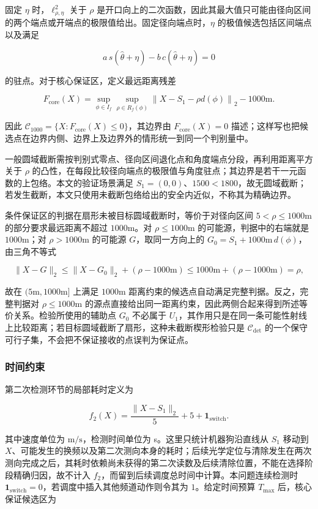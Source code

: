 固定 $\eta$ 时，$\ell_{\rho,\eta}^2$ 关于 $\rho$ 是开口向上的二次函数，因此其最大值只可能由径向区间的两个端点或开端点的极限值给出。固定径向端点时，$\eta$ 的极值候选包括区间端点以及满足

\[
a\,s(\hat\theta+\eta)-b\,c(\hat\theta+\eta)=0
\]

的驻点。对于核心保证区，定义最远距离残差

\[
F_{\mathrm{core}}(X)=
\sup_{\phi\in I_f}\sup_{\rho\in R_f(\phi)}
\left\lVert
X-S_1-\rho d(\phi)
\right\rVert_2-1000\mathrm{m}.
\]

因此 $\mathcal C_{1000}=\{X:F_{\mathrm{core}}(X)\le0\}$，其边界由 $F_{\mathrm{core}}(X)=0$ 描述；这样写也把候选点在边界内侧、边界上及边界外的情形统一到同一个判别量中。

一般圆域截断需按判别式零点、径向区间退化点和角度端点分段，再利用距离平方关于 $\rho$ 的凸性，在每段比较径向端点的极限值与角度驻点；其边界是若干一元函数的上包络。本文的验证场景满足 $S_1=(0,0)$、$1500<1800$，故无圆域截断；若发生截断，本文只使用未截断包络给出的安全内近似，不称其为精确边界。

条件保证区的判据在扇形未被目标圆域截断时，等价于对径向区间 $5<\rho\le1000\mathrm{m}$ 的部分要求最远距离不超过 $1000\mathrm{m}$。对 $\rho\le1000\mathrm{m}$ 的可能源，判据中的右端就是 $1000\mathrm{m}$；对 $\rho>1000\mathrm{m}$ 的可能源 $G$，取同一方向上的 $G_0=S_1+1000\mathrm{m}\,d(\phi)$，由三角不等式

\[
\lVert X-G\rVert_2
\le\lVert X-G_0\rVert_2+(\rho-1000\mathrm{m})
\le1000\mathrm{m}+(\rho-1000\mathrm{m})=\rho,
\]

故在 $(5\mathrm{m},1000\mathrm{m}]$ 上满足 $1000\mathrm{m}$ 距离约束的候选点自动满足完整判据。反之，完整判据对 $\rho\le1000\mathrm{m}$ 的源点直接给出同一距离约束，因此两侧合起来得到所述等价关系。检验所使用的辅助点 $G_0$ 不必属于 $U_1$，其作用只是在同一条可能性射线上比较距离；若目标圆域截断了扇形，这种未截断楔形检验只是 $\mathcal C_{\det}$ 的一个保守可行子集，不会把不保证接收的点误判为保证点。

\subsubsection{时间约束}

第二次检测环节的局部耗时定义为

\[
f_2(X)=
\frac{\lVert X-S_1\rVert_2}{5}
+5+\mathbf 1_{\mathrm{switch}}.
\]

其中速度单位为 $\mathrm{m/s}$，检测时间单位为 s。这里只统计机器狗沿直线从 $S_1$ 移动到 $X$、可能发生的换频以及第二次测向本身的耗时；后续光学定位与清除发生在两次测向完成之后，其耗时依赖尚未获得的第二次读数及后续清除位置，不能在选择阶段精确归因，故不计入 $f_2$，而留到后续调度总时间中计算。本问题连续检测时 $\mathbf 1_{\mathrm{switch}}=0$，若调度中插入其他频道动作则令其为 $1$。给定时间预算 $T_{\max}$ 后，核心保证候选区为

